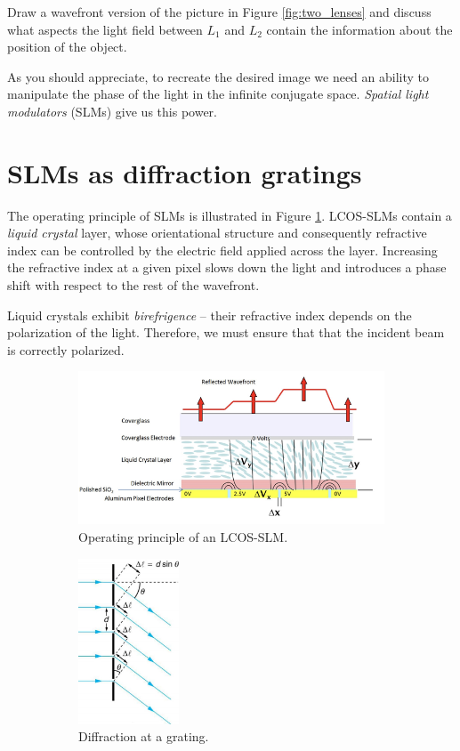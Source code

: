\documentclass[a4paper]{report}
\newcommand{\nexercise}[0]{\arabic{exercises}\addtocounter{exercises}{1}}
\begin{document}
\begin{exercisebox}[frametitle={Exercise \nexercise}: Infinite conjugate system - wavefront picture]
Draw a wavefront version of the picture in Figure \ref{fig:two_lenses} and discuss what aspects the light field between $L_1$ and $L_2$ contain the information about the position of the object.	
\end{exercisebox}

As you should appreciate, to recreate the desired image we need an ability to manipulate the phase of the light in the infinite conjugate space. \textit{Spatial light modulators} (SLMs) give us this power.

\section{SLMs as diffraction gratings}
The operating principle of SLMs is illustrated in Figure \ref{fig:slm}. LCOS-SLMs contain a \textit{liquid crystal} layer, whose orientational structure and consequently refractive index can be controlled by the electric field applied across the layer. Increasing the refractive index at a given pixel slows down the light and introduces a phase shift with respect to the rest of the wavefront.

Liquid crystals exhibit \textit{birefrigence} -- their refractive index depends on the polarization of the light. Therefore, we must ensure that that the incident beam is correctly polarized.

\begin{figure}
	\centering
    \begin{subfigure}[b]{0.69\textwidth}	
	\includegraphics[width=\textwidth]{slm}
	\caption{Operating principle of an LCOS-SLM.}
	\label{fig:slm}
	\end{subfigure}
	\begin{subfigure}[b]{0.3\textwidth}	
		\includegraphics[width=3cm]{grating.jpg}
	\caption{Diffraction at a grating.}
	\label{fig:grating}	
	\end{subfigure}
	\caption{}
\end{figure}
\end{document}
